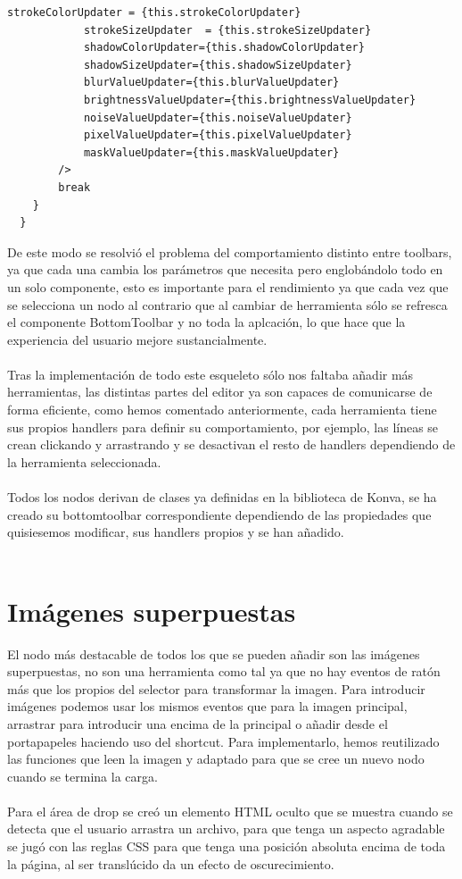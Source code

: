 \begin{lstlisting}[caption={Switch del componente BottomToolbar principal que devuelve la BottomToolbar según el estado.}]
            strokeColorUpdater = {this.strokeColorUpdater}
            strokeSizeUpdater  = {this.strokeSizeUpdater}
            shadowColorUpdater={this.shadowColorUpdater}
            shadowSizeUpdater={this.shadowSizeUpdater}
            blurValueUpdater={this.blurValueUpdater}
            brightnessValueUpdater={this.brightnessValueUpdater}
            noiseValueUpdater={this.noiseValueUpdater}
            pixelValueUpdater={this.pixelValueUpdater}
            maskValueUpdater={this.maskValueUpdater}
        />
        break
    }
  }
\end{lstlisting}

De este modo se resolvió el problema del comportamiento distinto entre toolbars, ya que cada
una cambia los parámetros que necesita pero englobándolo todo en un solo componente, esto es 
importante para el rendimiento ya que cada vez que se selecciona un nodo al contrario que al
cambiar de herramienta sólo se refresca el componente BottomToolbar y no toda la aplcación,
lo que hace que la experiencia del usuario mejore sustancialmente.
\\\\
Tras la implementación de todo este esqueleto sólo nos faltaba añadir más herramientas, las 
distintas partes del editor ya son capaces de comunicarse de forma eficiente, como hemos
comentado anteriormente, cada herramienta tiene sus propios handlers para definir su comportamiento,
por ejemplo, las líneas se crean clickando y arrastrando y se desactivan el resto de handlers dependiendo
de la herramienta seleccionada.
\\\\
Todos los nodos derivan de clases ya definidas en la biblioteca de Konva\cite{KonvaJS},
se ha creado su bottomtoolbar correspondiente dependiendo de las propiedades que quisiesemos modificar,
sus handlers propios y se han añadido.
\\\\

\newpage
\section{Imágenes superpuestas}

El nodo más destacable de todos los que se pueden añadir son las imágenes superpuestas, no son
una herramienta como tal ya que no hay eventos de ratón más que los propios del selector para
transformar la imagen. Para introducir imágenes podemos usar los mismos eventos que para la imagen
principal, arrastrar para introducir una encima de la principal o añadir desde el portapapeles 
haciendo uso del shortcut. Para implementarlo, hemos reutilizado las funciones que leen la imagen
y adaptado para que se cree un nuevo nodo cuando se termina la carga. 
\\\\
Para el área de drop se creó un elemento HTML oculto que se muestra cuando se detecta que el 
usuario arrastra un archivo, para que tenga un aspecto agradable se jugó con las reglas CSS 
para que tenga una posición absoluta encima de toda la página,
 al ser translúcido da un efecto de oscurecimiento.

